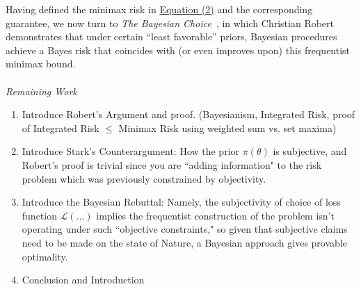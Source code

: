 \documentclass[letterpaper,12pt]{article}
\begin{document}
Having defined the minimax risk in \hyperref[eq:minimaxrisk]{Equation (2)} and the corresponding guarantee, we now turn to \textit{The Bayesian Choice} \cite{robert2007bayesian}, in which Christian Robert demonstrates that under certain “least favorable” priors, Bayesian procedures achieve a Bayes risk that coincides with (or even improves upon) this frequentist minimax bound.
\\ \\ 
\textit{Remaining Work}
\begin{enumerate}\item{Introduce Robert's Argument and proof. (Bayesianism, Integrated Risk, proof of Integrated Risk $\leq$ Minimax Risk using weighted sum vs. set maxima)} 
\item{Introduce Stark's Counterargument: How the prior $\pi(\theta)$ is subjective, and Robert's proof is trivial since you are ``adding information" to the risk problem which was previously constrained by objectivity.}
\item{Introduce the Bayesian Rebuttal: Namely, the subjectivity of choice of loss function $\mathcal{L}(\dots)$ implies the frequentist construction of the problem isn't operating under such ``objective constraints," so given that subjective claims need to be made on the state of Nature, a Bayesian approach gives provable optimality. }
\item{Conclusion and Introduction }
 \end{enumerate}
\end{document}
